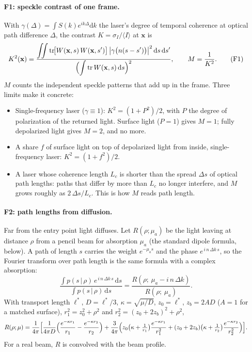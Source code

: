 \documentclass[11pt]{article}
\newcommand{\dd}{\mathrm{d}}
\newcommand{\tr}{\operatorname{tr}}
\begin{document}
\paragraph{F1: speckle contrast of one frame.} With $\gamma(\Delta)=\int S(k)e^{ik\Delta}\dd k$ the laser's degree of
temporal coherence at optical path difference $\Delta$, the contrast $K=\sigma_I/\langle I\rangle$ at $\mathbf{x}$ is
\begin{equation}
K^2(\mathbf{x})=\frac{\displaystyle\iint \tr\!\bigl[W(\mathbf{x},s)\,W(\mathbf{x},s')\bigr]\,
\bigl|\gamma\bigl(n(s-s')\bigr)\bigr|^2\,\dd s\,\dd s'}{\Bigl(\displaystyle\int \tr W(\mathbf{x},s)\,\dd s\Bigr)^2},
\qquad M=\frac{1}{K^2}. \tag{F1}
\end{equation}
$M$ counts the independent speckle patterns that add up in the frame. Three limits make it concrete:
\begin{itemize}
\item Single-frequency laser ($\gamma\equiv1$): $K^2=(1+P^2)/2$, with $P$ the degree of polarization of the returned
  light. Surface light ($P=1$) gives $M=1$; fully depolarized light gives $M=2$, and no more.
\item A share $f$ of surface light on top of depolarized light from inside, single-frequency laser: $K^2=(1+f^2)/2$.
\item A laser whose coherence length $L_c$ is shorter than the spread $\Delta s$ of optical path lengths: paths that
  differ by more than $L_c$ no longer interfere, and $M$ grows roughly as $2\,\Delta s/L_c$. This is how $M$ reads path
  length.
\end{itemize}

\paragraph{F2: path lengths from diffusion.} Far from the entry point light diffuses. Let
$R(\rho;\mu_a)$ be the light leaving at distance $\rho$ from a pencil beam for absorption $\mu_a$ (the standard
dipole formula, below). A path of length $s$ carries the weight $e^{-\mu_a s}$ and the phase $e^{\,i\,n\,\Delta k\,s}$,
so the Fourier transform over path length is the same formula with a complex absorption:
\begin{equation}
\frac{\displaystyle\int p(s\,|\,\rho)\,e^{\,i\,n\,\Delta k\,s}\,\dd s}{\displaystyle\int p(s\,|\,\rho)\,\dd s}
=\frac{R(\rho;\ \mu_a-i\,n\,\Delta k)}{R(\rho;\ \mu_a)} . \tag{F2}
\end{equation}
With transport length $\ell^*$, $D=\ell^*/3$, $\kappa=\sqrt{\mu/D}$, $z_0=\ell^*$, $z_b=2AD$ ($A=1$ for a matched
surface), $r_1^2=z_0^2+\rho^2$ and $r_2^2=(z_0+2z_b)^2+\rho^2$,
\begin{equation}
R(\rho;\mu)=\frac{1}{4\pi}\Bigl[\frac{1}{4\pi D}\Bigl(\frac{e^{-\kappa r_1}}{r_1}-\frac{e^{-\kappa r_2}}{r_2}\Bigr)
+\frac{3}{4\pi}\Bigl(z_0\bigl(\kappa+\tfrac{1}{r_1}\bigr)\frac{e^{-\kappa r_1}}{r_1^2}
+(z_0+2z_b)\bigl(\kappa+\tfrac{1}{r_2}\bigr)\frac{e^{-\kappa r_2}}{r_2^2}\Bigr)\Bigr].
\end{equation}
For a real beam, $R$ is convolved with the beam profile.
\end{document}
